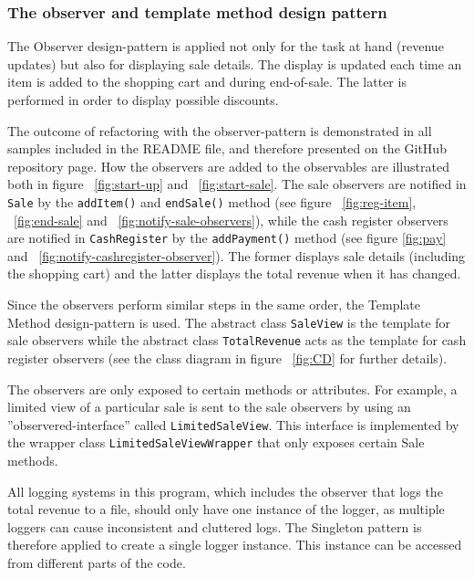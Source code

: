 \documentclass[a4paper]{scrreprt}
\begin{document}
\subsubsection{The observer and template method design pattern}
The Observer design-pattern is applied not only for the task at hand (revenue updates)
but also for displaying sale details.
The display is updated each time an item is added to the shopping cart
and during end-of-sale.
The latter is performed in order to display possible discounts.

The outcome of refactoring with the observer-pattern
is demonstrated in all samples included in the README file,
and therefore presented on the GitHub repository page.
How the observers are added to the observables are illustrated both
in figure ~\ref{fig:start-up} and ~\ref{fig:start-sale}.
The sale observers are notified in \texttt{Sale} by the
\texttt{addItem()} and
\texttt{endSale()} method
(see figure ~\ref{fig:reg-item}, ~\ref{fig:end-sale}
and ~\ref{fig:notify-sale-observers}),
while the cash register observers are notified in
\texttt{CashRegister} by the
\texttt{addPayment()} method
(see figure \ref{fig:pay} and ~\ref{fig:notify-cashregister-observer}).
The former displays sale details (including the shopping cart)
and the latter displays the total revenue
when it has changed.

Since the observers perform similar steps in the same order,
the Template Method design-pattern is used.
The abstract class \texttt{SaleView} is the template
for sale observers
while the abstract class \texttt{TotalRevenue}
acts as the template for cash register observers
(see the class diagram in figure ~\ref{fig:CD} for further details).

The observers are only exposed to certain methods or attributes.
For example, a limited view of a particular sale is sent to the
sale observers by using an ''observered-interface'' called
\texttt{LimitedSaleView}.
This interface is implemented by the wrapper class
\texttt{LimitedSaleViewWrapper} that
only exposes certain Sale methods.

All logging systems in this program, which includes the observer that logs the total revenue to a file,
should only have one instance of the logger,
as multiple loggers can cause inconsistent and cluttered logs.
The Singleton pattern is therefore applied to create a
single logger instance.
This instance can be accessed from different parts of the code.
\end{document}
